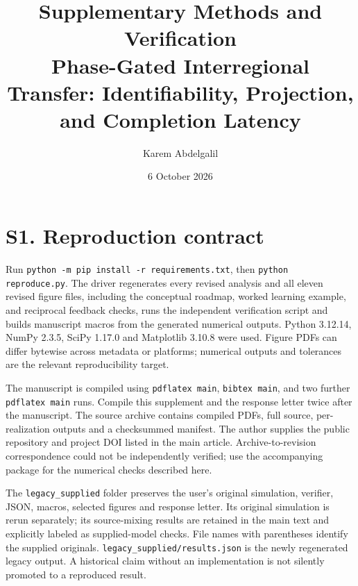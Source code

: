 \documentclass[11pt,a4paper]{article}
\title{Supplementary Methods and Verification\\\large Phase-Gated Interregional Transfer: Identifiability, Projection, and Completion Latency}
\author{Karem Abdelgalil}\date{6 October 2026}
\begin{document}
\renewcommand{\thefigure}{S\arabic{figure}}\maketitle
\section*{S1. Reproduction contract}
Run \texttt{python -m pip install -r requirements.txt}, then \texttt{python reproduce.py}. The driver regenerates every revised analysis and all eleven revised figure files, including the conceptual roadmap, worked learning example, and reciprocal feedback checks, runs the independent verification script and builds manuscript macros from the generated numerical outputs. Python 3.12.14, NumPy 2.3.5, SciPy 1.17.0 and Matplotlib 3.10.8 were used. Figure PDFs can differ bytewise across metadata or platforms; numerical outputs and tolerances are the relevant reproducibility target.

The manuscript is compiled using \texttt{pdflatex main}, \texttt{bibtex main}, and two further \texttt{pdflatex main} runs. Compile this supplement and the response letter twice after the manuscript. The source archive contains compiled PDFs, full source, per-realization outputs and a checksummed manifest. The author supplies the public repository and project DOI listed in the main article. Archive-to-revision correspondence could not be independently verified; use the accompanying package for the numerical checks described here.

The \texttt{legacy\_supplied} folder preserves the user's original simulation, verifier, JSON, macros, selected figures and response letter. Its original simulation is rerun separately; its source-mixing results are retained in the main text and explicitly labeled as supplied-model checks. File names with parentheses identify the supplied originals. \texttt{legacy\_supplied/results.json} is the newly regenerated legacy output. A historical claim without an implementation is not silently promoted to a reproduced result.
\end{document}
